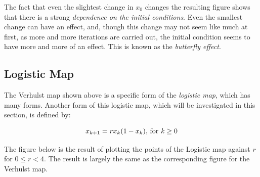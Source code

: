 \documentclass[a4wide, 10pt]{article}
\begin{document}
The fact that even the slightest change in $x_{0}$ changes the resulting figure shows that there is a
 strong \emph{dependence on the initial conditions}. Even the smallest change can have an effect, and,
  though this change may not seem like much at first, as more and more iterations are carried out, the
   initial condition seems to have more and more of an effect. This is known as the \emph{butterfly
    effect}\cite{Butterfly Effect}.

\subsection{Logistic Map}

The Verhulst map shown above is a specific form of the \emph{logistic map}, which
 has many forms. Another form of this logistic map, which will be investigated in
  this section, is defined by:

\[
  x_{k+1} = rx_{k}(1 - x_{k}) \textrm{, for \emph{k}} \geq 0
\]



The figure below is the result of plotting the points of the Logistic map against $r$ for $0 \leq r < 4$.
 The result is largely the same as the corresponding figure for the Verhulst map. %

\end{document}

